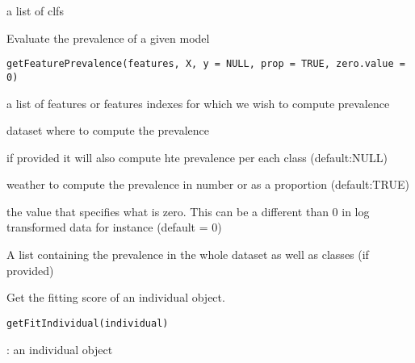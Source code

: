 \documentclass[a4paper]{book}
\begin{document}
%
\begin{Value}
a list of clfs
\end{Value}
%
\begin{Description}
Evaluate the prevalence of a given model
\end{Description}
%
\begin{Usage}
\begin{verbatim}
getFeaturePrevalence(features, X, y = NULL, prop = TRUE, zero.value = 0)
\end{verbatim}
\end{Usage}
%
\begin{Arguments}
\begin{ldescription}
\item[\code{features:}] a list of features or features indexes for which we wish to compute prevalence

\item[\code{X:}] dataset where to compute the prevalence

\item[\code{y:}] if provided it will also compute hte prevalence per each class (default:NULL)

\item[\code{prop:}] weather to compute the prevalence in number or as a proportion (default:TRUE)

\item[\code{zero.value:}] the value that specifies what is zero. This can be a different than 0 in log transformed data for instance (default = 0)
\end{ldescription}
\end{Arguments}
%
\begin{Value}
A list containing the prevalence in the whole dataset as well as classes (if provided)
\end{Value}
%
\begin{Description}
Get the fitting score of an individual object.
\end{Description}
%
\begin{Usage}
\begin{verbatim}
getFitIndividual(individual)
\end{verbatim}
\end{Usage}
%
\begin{Arguments}
\begin{ldescription}
\item[\code{individual}] : an individual object
\end{ldescription}
\end{Arguments}
\end{document}

